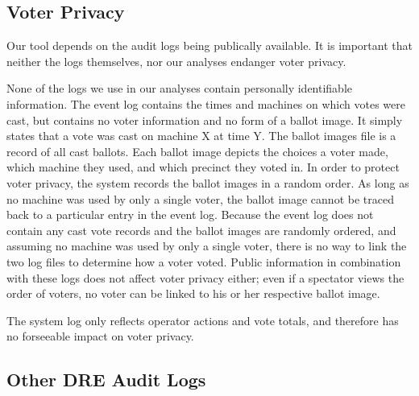 \documentclass[letterpaper,twocolumn,10pt]{article}
\begin{document}
\subsection{Voter Privacy}
Our tool depends on the audit logs being publically available. It is important
that neither the logs themselves, nor our analyses endanger voter privacy. 

None of the logs we use in our analyses contain personally identifiable
information. The event log contains the times and machines on which votes  
were cast, but contains no voter information and no form of a ballot image. It
simply  
states that a vote was cast on machine X at time Y. The ballot images file is a 
record of all cast ballots.  Each ballot image 
depicts the choices a voter made, which machine they used, and which precinct they 
voted in. In order to protect voter privacy, the system records the ballot images 
in a random order. As long as no machine was used by only a single voter, the
ballot image cannot be traced back 
to a particular entry in the event log. Because the event log does not 
contain any cast vote records and the ballot images are randomly ordered, and
assuming no machine was used by only a single voter, there is 
no way to link the two log files to determine how a voter voted. Public
information in combination with these logs does not affect voter privacy either;
even if a spectator views the order of voters, no voter can be linked to his or
her respective ballot image.     

The system log only reflects operator actions and vote
totals, and therefore has no forseeable impact on voter privacy. 

\subsection{Other DRE Audit Logs}
\end{document}
